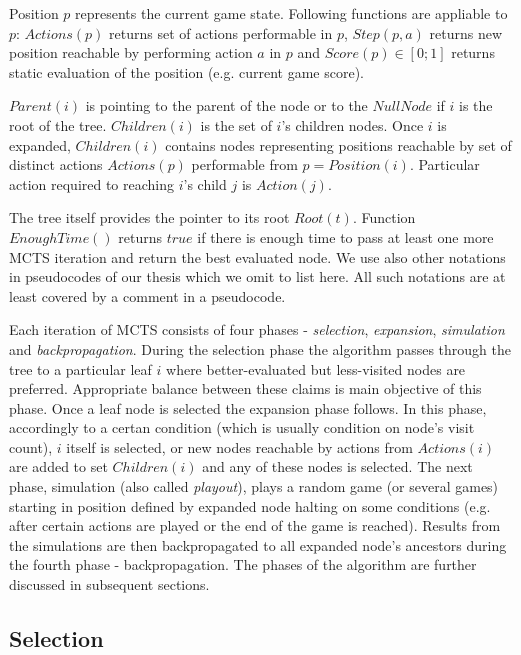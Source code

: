 Position $p$ represents the current game state. Following
functions are appliable to $p$: $Actions(p)$ returns set of actions performable in $p$,
$Step(p, a)$ returns new position reachable by performing action $a$ in $p$ and $Score(p) \in
[0;1]$ returns static evaluation of the position (e.g. current game score).

$Parent(i)$ is
pointing to the parent of the node or to the $NullNode$ if $i$ is the root of the tree.
$Children(i)$ is the set of $i$'s children nodes. Once $i$ is expanded, $Children(i)$ contains
nodes representing positions reachable by set of
distinct actions $Actions(p)$ performable from $p = Position(i)$.
Particular action required to reaching $i$'s child $j$ is $Action(j)$.

The
tree itself provides the pointer to its root $Root(t)$. Function $EnoughTime()$ returns $true$ if
there is enough time to pass at least one more MCTS iteration and return the best evaluated
node. We use also other notations in pseudocodes of our thesis which we omit to list here. All
such notations are at least covered by a comment in a pseudocode.

Each iteration of MCTS consists of four
phases - \emph{selection}, \emph{expansion}, \emph{simulation} and \emph{backpropagation}. During
the selection phase the 
algorithm passes through the tree to a particular leaf $i$ where better-evaluated but less-visited nodes
are preferred. Appropriate balance between these claims is main objective of this
phase. Once a leaf node is selected the expansion phase follows. In this phase, accordingly to a
certan condition (which is usually condition on node's visit count), $i$ itself is selected, or
new nodes reachable by actions from $Actions(i)$ are added to set $Children(i)$ and any of these
nodes is selected.
The next phase, simulation (also called \emph{playout}), plays a random game (or several games) 
starting
in position defined by expanded node halting on some conditions (e.g. after certain actions are
played or the end of the game is reached). Results from the simulations are then backpropagated to all
expanded node's ancestors during the fourth phase - backpropagation. The phases of the algorithm are
further discussed in subsequent sections.


\subsection{Selection}


